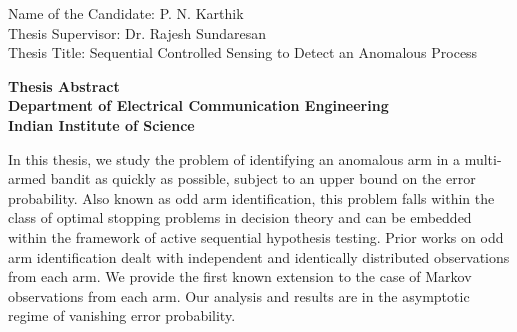 \documentclass[10pt]{letter} %
\begin{document}

\begin{letter}{Name of the Candidate: P. N. Karthik\\
Thesis Supervisor: Dr. Rajesh Sundaresan\\
Thesis Title: Sequential Controlled Sensing to Detect an Anomalous Process\\
} 


\begin{center}
\Large\bf
Thesis Abstract\\Department of Electrical Communication Engineering \\Indian Institute of Science %
\end{center} 


\opening{}
\hspace{1cm}

In this thesis, we study the problem of identifying an anomalous arm in a multi-armed bandit as quickly as possible, subject to an upper bound on the error probability. Also known as odd arm identification, this problem falls within the class of optimal stopping problems in decision theory and can be embedded within the framework of active sequential hypothesis testing. Prior works on odd arm identification dealt with independent and identically distributed observations from each arm. We provide the first known extension to the case of Markov observations from each arm. Our analysis and results are in the asymptotic regime of vanishing error probability.


\end{letter}
\end{document}
